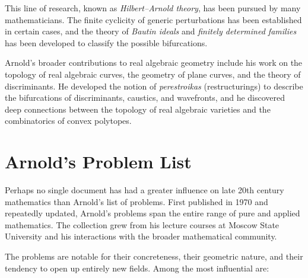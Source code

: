 This line of research, known as \emph{Hilbert--Arnold theory}, has been pursued by many mathematicians. The finite cyclicity of generic perturbations has been established in certain cases, and the theory of \emph{Bautin ideals} and \emph{finitely determined families} has been developed to classify the possible bifurcations.

Arnold's broader contributions to real algebraic geometry include his work on the topology of real algebraic curves, the geometry of plane curves, and the theory of discriminants. He developed the notion of \emph{perestroikas} (restructurings) to describe the bifurcations of discriminants, caustics, and wavefronts, and he discovered deep connections between the topology of real algebraic varieties and the combinatorics of convex polytopes.

\section{Arnold's Problem List}

Perhaps no single document has had a greater influence on late 20th century mathematics than Arnold's list of problems. First published in 1970 and repeatedly updated, Arnold's problems span the entire range of pure and applied mathematics. The collection grew from his lecture courses at Moscow State University and his interactions with the broader mathematical community.

The problems are notable for their concreteness, their geometric nature, and their tendency to open up entirely new fields. Among the most influential are:

